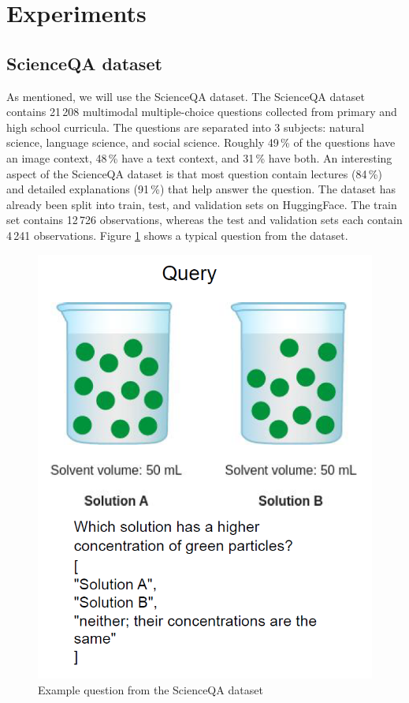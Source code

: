 \documentclass{article}
\begin{document}
\section{Experiments}
\label{sec:experiments}

\subsection{ScienceQA dataset}
As mentioned, we will use the ScienceQA dataset. The ScienceQA dataset contains 21\,208 multimodal multiple-choice questions collected from primary and high school curricula. The questions are separated into 3 subjects: natural science, language science, and social science. Roughly 49\,\% of the questions have an image context, 48\,\% have a text context, and 31\,\% have both. An interesting aspect of the ScienceQA dataset is that most question contain lectures (84\,\%) and detailed explanations (91\,\%) that help answer the question. The dataset has already been split into train, test, and validation sets on HuggingFace. The train set contains 12\,726 observations, whereas the test and validation sets each contain 4\,241 observations. Figure \ref{fig:example_q} shows a typical question from the dataset.

\begin{figure}
  \centering
  \centerline{\includegraphics[scale=0.5]{example_question.png}}
  \caption{Example question from the ScienceQA dataset}
  \label{fig:example_q}
\end{figure}
\end{document}
